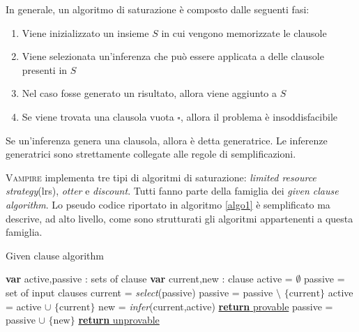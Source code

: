 In generale, un algoritmo di saturazione è composto dalle seguenti fasi:
\begin{enumerate}
    \item Viene inizializzato un insieme $S$ in cui vengono memorizzate le clausole
    \item Viene selezionata un'inferenza che può essere applicata a delle clausole presenti in $S$
    \item Nel caso fosse generato un risultato, allora viene aggiunto a $S$
    \item Se viene trovata una clausola vuota $\square$, allora il problema è insoddisfacibile
\end{enumerate}
Se un'inferenza genera una clausola, allora è detta generatrice. Le inferenze generatrici 
sono strettamente collegate alle regole di semplificazioni.

\textsc{Vampire} implementa tre tipi di algoritmi di saturazione: \emph{limited resource strategy}(lrs), \emph{otter} e \emph{discount}.
Tutti fanno parte della famiglia dei \emph{given clause algorithm}. Lo pseudo codice riportato in algoritmo \ref{algo1} è semplificato 
ma descrive, ad alto livello, come sono strutturati gli algoritmi
appartenenti a questa famiglia. 
\begin{algorithm}
    \caption{Given clause algorithm}
    \begin{algorithmic}
        \State \textbf{var} active,passive : sets of clause 
        \State \textbf{var} current,new : clause
        \State active = $\emptyset$
        \State passive = set of input clauses
            \State current = \emph{select}(passive)
            \State passive = passive $\setminus$ $\{\text{current}\}$
            \State active = active $\cup$ $\{\text{current}\}$
            \State new = \emph{infer}(current,active)
                \State \underline{\textbf{return} provable}
            \EndIf
            \State passive = passive $\cup$ $\{\text{new}\}$ 
        \EndWhile
        \State \underline{\textbf{return} unprovable}
    \end{algorithmic}
    \label{algo1}
\end{algorithm}

